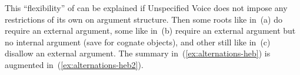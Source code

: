 This ``flexibility'' of {\tkal} can be explained if Unspecified Voice does not impose any restrictions of its own on argument structure. Then some roots like  in~(\lastx a) do require an external argument, some like  in~(\lastx b) require an external argument but no internal argument (save for cognate objects), and other still like  in~(\lastx c) disallow an external argument. The summary in~(\ref{ex:alternations-heb}) is augmented in~(\ref{ex:alternations-heb2}).
\ex\label{ex:alternations-heb2}
\xe


